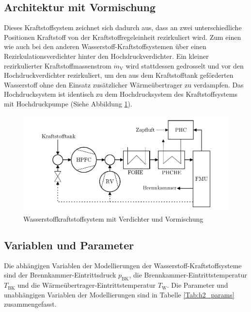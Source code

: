 \subsection{Architektur mit Vormischung}

Dieses Kraftstoffsystem zeichnet sich dadurch aus, dass an zwei unterschiedliche Positionen Kraftstoff von der Kraftstoffregeleinheit rezirkuliert wird. Zum einen wie auch bei den anderen Wasserstoff-Kraftstoffsystemen über einen Rezirkulationsverdichter hinter den Hochdruckverdichter. Ein kleiner rezirkulierter Kraftstoffmassenstrom $\dot{m}_\mathrm{V}$ wird stattdessen gedrosselt und vor den Hochdruckverdichter rezirkuliert, um den aus dem Kraftstofftank geförderten Wasserstoff ohne den Einsatz zusätzlicher Wärmeübertrager zu verdampfen. Das Hochdrucksystem ist identisch zu dem Hochdrucksystem des Kraftstoffsystems mit Hochdruckpumpe (Siehe Abbildung \ref{fig:vormischung}).

\begin{figure}[ht]
\centering
\includegraphics[width=1\linewidth]{4_Abbildungen/2_Hauptteil/Kraftstoffsystem Abbildungen/dual.pdf}
  \caption{Wasserstoffkraftstoffsystem mit Verdichter und Vormischung}
  \label{fig:vormischung}
\end{figure}
\FloatBarrier 

\subsection{Variablen und Parameter}

Die abhängigen Variablen der Modellierungen der Wasserstoff-Kraftstoffsysteme sind der Brennkammer-Eintrittsdruck $p_{\mathrm{BK}}$, die Brennkammer-Eintrittstemperatur $T_\mathrm{BK}$ und die Wärmeübertrager-Eintrittstemperatur $T_\mathrm{W}$. Die Parameter und unabhängigen Variablen der Modellierungen sind in Tabelle \ref{Tab:h2_params} zusammengefasst.


